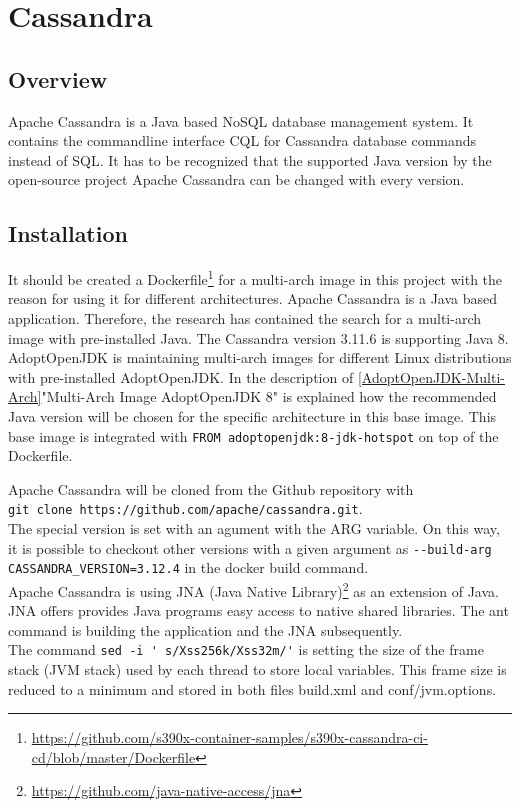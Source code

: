 \chapter{Cassandra}\label{ch:cassandra}

\section{Overview}

Apache Cassandra is a Java based NoSQL database management system. It contains the commandline interface CQL for Cassandra database commands instead of SQL. It has to be recognized that the supported Java version by the open-source project Apache Cassandra can be changed with every version. 

\section{Installation}\label{Cassandra-Installation}

It should be created a Dockerfile\footnote{\url{https://github.com/s390x-container-samples/s390x-cassandra-ci-cd/blob/master/Dockerfile}} for a multi-arch image in this project with the reason for using it for different architectures.
Apache Cassandra is a Java based application. Therefore, the research has contained the search for a multi-arch image with pre-installed Java. The Cassandra version 3.11.6 is supporting Java 8. 
AdoptOpenJDK is maintaining multi-arch images for different Linux distributions with pre-installed AdoptOpenJDK.
In the description of \ref{AdoptOpenJDK-Multi-Arch}"Multi-Arch Image AdoptOpenJDK 8" is explained how the recommended Java version will be chosen for the specific architecture in this base image. 
This base image is integrated with \lstinline!FROM adoptopenjdk:8-jdk-hotspot! on top of the Dockerfile.

Apache Cassandra will be cloned from the Github repository with \\
\lstinline!git clone https://github.com/apache/cassandra.git!. \\
The special version is set with an agument with the ARG variable. On this way, it is possible to checkout other versions with a given argument as \lstinline!--build-arg CASSANDRA_VERSION=3.12.4! in the docker build command. \\
Apache Cassandra is using JNA (Java Native Library)\footnote{\url{https://github.com/java-native-access/jna}} as an extension of Java. JNA offers provides Java programs easy access to native shared libraries. The ant command is building the application and the JNA subsequently. \\
The command \lstinline!sed -i ' s/Xss256k/Xss32m/'! is setting the size of the frame stack (JVM stack) used by each thread to store local variables. This frame size is reduced to a minimum and stored in both files build.xml and conf/jvm.options.

